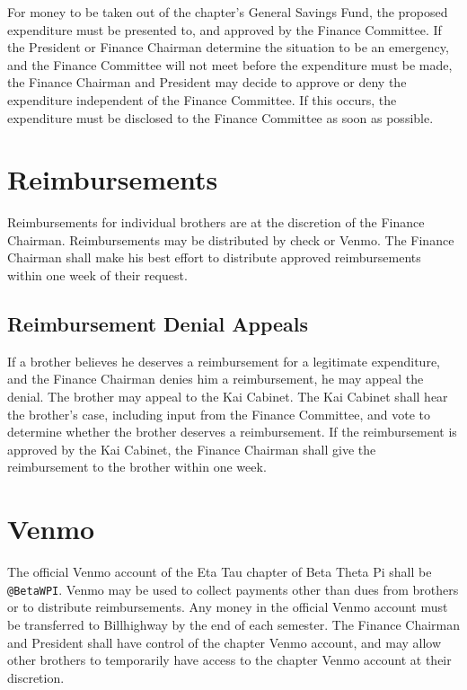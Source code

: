 For money to be taken out of the chapter’s General Savings Fund, the proposed
expenditure must be presented to, and approved by the Finance Committee.
If the President or Finance Chairman determine the situation to be an
emergency, and the Finance Committee will not meet before the expenditure must
be made, the Finance Chairman and President may decide to approve or deny the
expenditure independent of the Finance Committee.
If this occurs, the expenditure must be disclosed to the Finance Committee as
soon as possible.

\section{Reimbursements}

Reimbursements for individual brothers are at the discretion of the Finance
Chairman.
Reimbursements may be distributed by check or Venmo.
The Finance Chairman shall make his best effort to distribute approved
reimbursements within one week of their request.

\subsection{Reimbursement Denial Appeals}

If a brother believes he deserves a reimbursement for a legitimate expenditure,
and the Finance Chairman denies him a reimbursement, he may appeal the denial.
The brother may appeal to the Kai Cabinet.
The Kai Cabinet shall hear the brother’s case, including input from the Finance
Committee, and vote to determine whether the brother deserves a reimbursement.
If the reimbursement is approved by the Kai Cabinet, the Finance Chairman shall
give the reimbursement to the brother within one week.

\section{Venmo}

The official Venmo account of the Eta Tau chapter of Beta Theta Pi shall be
\texttt{@BetaWPI}.
Venmo may be used to collect payments other than dues from brothers or to
distribute reimbursements.
Any money in the official Venmo account must be transferred to Billhighway by
the end of each semester.
The Finance Chairman and President shall have control of the chapter Venmo
account, and may allow other brothers to temporarily have access to the chapter
Venmo account at their discretion.

